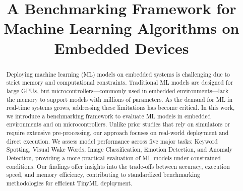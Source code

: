 \documentclass[conference]{IEEEtran}
\begin{document}
\title{A Benchmarking Framework for Machine Learning Algorithms on Embedded Devices\\

}

\author{
\and
{}
\and
{}
}

\maketitle

\begin{abstract}
Deploying machine learning (ML) models on embedded systems is challenging due to strict memory and computational constraints. Traditional ML models are designed for large GPUs, but microcontrollers—commonly used in embedded environments—lack the memory to support models with millions of parameters. As the demand for ML in real-time systems grows, addressing these limitations has become critical. In this work, we introduce a benchmarking framework to evaluate ML models in embedded environments and on microcontrollers. Unlike prior studies that rely on simulators or require extensive pre-processing, our approach focuses on real-world deployment and direct execution. We assess model performance across five major tasks: Keyword Spotting, Visual Wake Words, Image Classification, Emotion Detection, and Anomaly Detection, providing a more practical evaluation of ML models under constrained conditions. Our findings offer insights into the trade-offs between accuracy, execution speed, and memory efficiency, contributing to standardized benchmarking methodologies for efficient TinyML deployment.


\end{abstract}
\end{document}
